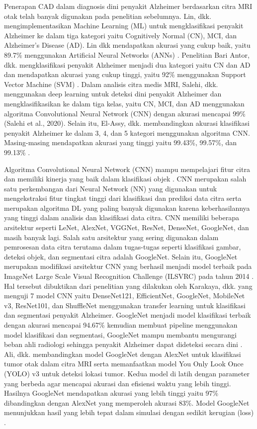     Penerapan CAD dalam diagnosis dini penyakit Alzheimer berdasarkan citra MRI otak telah banyak digunakan pada penelitian sebelumnya. Lin, dkk. mengimplementasikan Machine Learning (ML) untuk mengklasifikasi penyakit Alzheimer ke dalam tiga kategori yaitu Cognitively Normal (CN), MCI, dan Alzheimer's Disease (AD). Lin dkk mendapatkan akurasi yang cukup baik, yaitu 89.7\% menggunakan Artificial Neural Networks (ANNs) \autocite{Lin2023}. Penelitian Bari Antor, dkk. mengklasifikasi penyakit Alzheimer menjadi dua kategori yaitu CN dan AD dan mendapatkan akurasi yang cukup tinggi, yaitu 92\% menggunakan Support Vector Machine (SVM) \autocite{BariAntor2021}. Dalam analisis citra medis MRI, Salehi, dkk. menggunakan deep learning untuk deteksi dini penyakit Alzheimer dan mengklasifikasikan ke dalam tiga kelas, yaitu CN, MCI, dan AD menggunakan algoritma Convolutional Neural Network (CNN) dengan akurasi mencapai 99\% (Salehi et al., 2020). Selain itu, El-Assy, dkk. membandingkan akurasi klasifikasi penyakit Alzheimer ke dalam 3, 4, dan 5 kategori menggunakan algoritma CNN. Masing-masing mendapatkan akurasi yang tinggi yaitu 99.43\%, 99.57\%, dan 99.13\%  \autocite{El-Assy2024}.

    Algoritma Convolutional Neural Network (CNN) mampu mempelajari fitur citra dan memiliki kinerja yang baik dalam klasifikasi objek \autocite{Ahmad2020}. CNN merupakan salah satu perkembangan dari Neural Network (NN) yang digunakan untuk mengekstraksi fitur tingkat tinggi dari klasifikasi dan prediksi data citra serta merupakan algoritma DL yang paling banyak digunakan karena keberhasilannya yang tinggi dalam analisis dan klasifikasi data citra. CNN memiliki beberapa arsitektur seperti LeNet, AlexNet, VGGNet, ResNet, DenseNet, GoogleNet, dan masih banyak lagi. Salah satu arsitektur yang sering digunakan dalam pemrosesan data citra terutama dalam tugas-tugas seperti klasifikasi gambar, deteksi objek, dan segmentasi citra adalah GoogleNet. Selain itu, GoogleNet merupakan modifikasi arsitektur CNN yang berhasil menjadi model terbaik pada ImageNet Large Scale Visual Recognition Challenge (ILSVRC) pada tahun 2014 \autocite{Saidah2022}. Hal tersebut dibuktikan dari penelitian yang dilakukan oleh Karakaya, dkk. yang menguji 7 model CNN yaitu DenseNet121, EfficientNet, GoogleNet, MobileNet v3, ResNet101, dan ShuffleNet menggunakan transfer learning untuk klasifikasi dan segmentasi penyakit Alzheimer. GoogleNet menjadi model klasifikasi terbaik dengan akurasi mencapai 94.67\% kemudian membuat pipeline menggunakan model klasifikasi dan segmentasi, GoogleNet mampu membantu mengurangi beban ahli radiologi sehingga penyakit Alzheimer dapat dideteksi secara dini \autocite{Karakaya2022}. Ali, dkk. membandingkan model GoogleNet dengan AlexNet untuk klasifikasi tumor otak dalam citra MRI serta memanfaatkan model You Only Look Once (YOLO) v3 untuk deteksi lokasi tumor. Kedua model di latih dengan parameter yang berbeda agar mencapai akurasi dan efisiensi waktu yang lebih tinggi. Hasilnya GoogleNet mendapatkan akurasi yang lebih tinggi yaitu 97\% dibandingkan dengan AlexNet yang memperoleh akurasi 83\%. Model GoogleNet menunjukkan hasil yang lebih tepat dalam simulasi dengan sedikit kerugian (loss) \autocite{Ali2022}.
    
